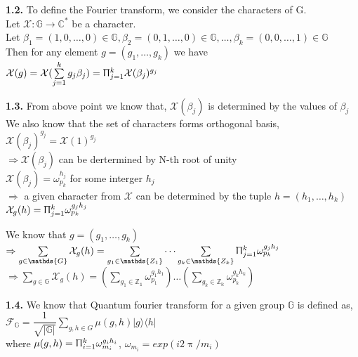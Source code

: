 \documentclass [12pt]{article}
\theoremstyle{definition}
\newcommand{\ket}[1]{| {#1} \rangle}
\newcommand{\bra}[1]{\langle {#1} |}
\newcommand{\md}[1]{|#1|}
\newcommand{\suml}[2]{\sum\limits_{#1}^{#2}}
\begin{document}
\phantom{1em} {\bf 1.2.} To define the Fourier transform, we consider the characters of G.\\
\phantom{1000em} Let $\mathcal{X} : \mathds{G} \rightarrow \mathds{C}^{*}$ be a character. \\
\phantom{1000em} Let $\beta_{1} = (1,0, \dots, 0) \in \mathds{G}, \beta_{2} = (0,1, \dots, 0) \in \mathds{G}, \dots ,\beta_{k} = (0,0, \dots, 1) \in \mathds{G}$\\
\phantom{1000em} Then for any element $g = (g_{1}, \dots , g_{k})$ we have \\
\phantom{1000em} $ \mathcal{X}(g) = \mathcal{X}(\suml{j=1}{k}g_{j}\beta_{j}) = \Uppi_{j=1}^{k}\mathcal{X}(\beta_{j})^{g_{j}}$ 

\phantom{1em} {\bf 1.3.} From above point we know that, $\mathcal{X}(\beta_{j})$ is determined by the values of $\beta_{j}$\\
\phantom{1000em} We also know that the set of characters forms orthogonal basis, \\
\phantom{1000em} $\mathcal{X}(\beta_{j})^{g_{j}} = \mathcal{X}(1)^{g_{j}}$\\
\phantom{1000em} $\Rightarrow \mathcal{X}(\beta_{j})$ can be dertermined by N-th root of unity\\
\phantom{1000em} $\mathcal{X}(\beta_{j}) = \omega_{p_{k}}^{h_{j}}$ for some interger $h_{j}$\\
\phantom{1000em} $\Rightarrow$ a given character from $\mathcal{X}$ can be determined by the tuple $h = (h_{1}, \dots , h_{k})$\\
\phantom{1000em} $\mathcal{X}_{g}(h) = \Uppi_{j=1}^{k}\omega_{p_{k}}^{g_{j}h_{j}}$

\phantom{1000em} We know that $g = (g_{1}, \dots , g_{k})$\\
\phantom{1000em} $\Rightarrow \suml{g \in \mathds{G}}{}\mathcal{X}_{g}(h) = \suml{g_{1} \in \mathds{Z_{1}}}{} \dots \suml{g_{k} \in \mathds{Z_{k}}}{} \Uppi_{j=1}^{k}\omega_{p_{k}}^{g_{j}h_{j}}$\\
\phantom{1000em} $\Rightarrow \suml{g \in \mathds{G}}{}\mathcal{X}_{g}(h) = (\suml{g_{1} \in \mathds{Z_{1}}}{} \omega_{p_{1}}^{g_{1}h_{1}}) \dots (\suml{g_{k} \in \mathds{Z_{k}}}{} \omega_{p_{k}}^{g_{k}h_{k}})$

\phantom{1em} {\bf 1.4.} We know that Quantum fourier transform for a given group $\mathds{G}$ is defined as,\\
\phantom{1000em} $\mathcal{F}_{\mathds{G}} = \dfrac{1}{\sqrt{\md{\mathds{G}}}}\suml{g,h \in G}{}\mu(g,h) \ket{g}\bra{h}$\\
\phantom{1000em} where $\mu(g,h) = \Uppi_{i=1}^{k}\omega_{m_{i}}^{g_{i}h_{i}}$, $\omega_{m_{i}} = exp(i2\uppi/m_{i})$
\end{document}
